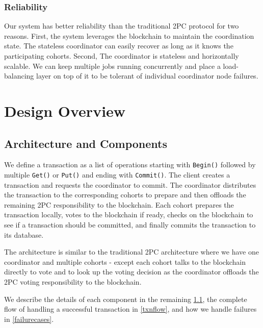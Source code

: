 \documentclass[11pt,sigplan,screen,nonacm]{acmart}
\begin{document}
\subsubsection{Reliability}
Our system has better reliability than the traditional 2PC protocol for two reasons. First, the system leverages the blockchain to maintain the coordination state. The stateless coordinator can easily recover as long as it knows the participating cohorts. Second, The coordinator is stateless and horizontally scalable. We can keep multiple jobs running concurrently and place a load-balancing layer on top of it to be tolerant of individual coordinator node failures.

\section{Design Overview}
\subsection{Architecture and Components} \label{components}

We define a transaction as a list of operations starting with \texttt{Begin()} followed by multiple \texttt{Get()} or \texttt{Put()} and ending with \texttt{Commit()}. The client creates a transaction and requests the coordinator to commit. The coordinator distributes the transaction to the corresponding cohorts to prepare and then offloads the remaining 2PC responsibility to the blockchain. Each cohort prepares the transaction locally, votes to the blockchain if ready, checks on the blockchain to see if a transaction should be committed, and finally commits the transaction to its database.

The architecture is similar to the traditional 2PC architecture where we have one coordinator and multiple cohorts - except each cohort talks to the blockchain directly to vote and to look up the voting decision as the coordinator offloads the 2PC voting responsibility to the blockchain.

We describe the details of each component in the remaining \ref{components}, the complete flow of handling a successful transaction in \ref{txnflow}, and how we handle failures in \ref{failurecases}.
\end{document}
